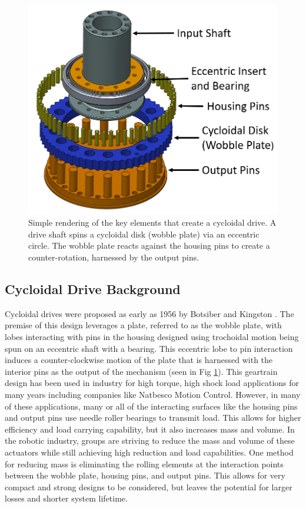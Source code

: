 \begin{figure}[!b]
   \centering
   \includegraphics[width=0.60\linewidth]{images/cycloid_cartoon_v2}
   \caption{Simple rendering of the key elements that create a cycloidal drive.
   A drive shaft spins a cycloidal disk (wobble plate) via an eccentric circle.
   The wobble plate reacts against the housing pins to create a counter-rotation, harnessed by the output pins.}
   \label{cycloid_cartoon}
\end{figure}

\subsection{Cycloidal Drive Background}
Cycloidal drives were proposed as early as 1956 by Botsiber and Kingston \cite{1956}.
The premise of this design leverages a plate, referred to as the wobble plate, with lobes interacting with pins in the housing designed using trochoidal motion being spun on an eccentric shaft with a bearing.
This eccentric lobe to pin interaction induces a counter-clockwise motion of the plate that is harnessed with the interior pins as the output of the mechanism (seen in Fig \ref{cycloid_cartoon}).
This geartrain design has been used in industry for high torque, high shock load applications for many years including companies like Natbesco Motion Control.
However, in many of these applications, many or all of the interacting surfaces like the housing pins and output pins use needle roller bearings to transmit load.
This allows for higher efficiency and load carrying capability, but it also increases mass and volume.
In the robotic industry, groups are striving to reduce the mass and volume of these actuators while still achieving high reduction and load capabilities.
One method for reducing mass is eliminating the rolling elements at the interaction points between the wobble plate, housing pins, and output pins.
This allows for very compact and strong designs to be considered, but leaves the potential for larger losses and shorter system lifetime.

